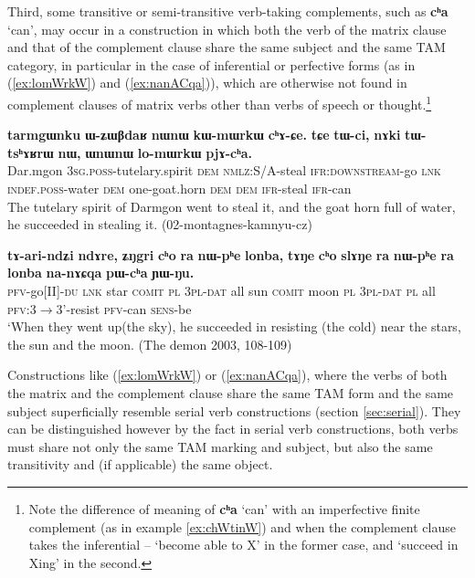 \documentclass[oneside,a4paper,11pt]{article}
\newcommand{\ipa}[1]{\textbf{\phon#1}} %
\newcommand{\jpg}[2]{\ipa{#1} `#2'} %
\newcommand{\refb}[1]{(\ref{#1})}
\begin{document}
Third, some transitive or semi-transitive verb-taking complements, such as \jpg{cʰa}{can}, may occur in a construction in which both the verb of the matrix clause and that of the complement clause share the same subject and the same TAM category, in particular in the case of inferential or perfective forms (as in \refb{ex:lomWrkW} and \refb{ex:nanACqa}), which are otherwise not found in complement clauses of matrix verbs other than verbs of speech or thought.\footnote{Note the difference of meaning of \jpg{cʰa}{can} with an imperfective finite complement (as in example \ref{ex:chWtinW}) and when the complement clause takes the inferential -- `become able to X' in the former case, and `succeed in Xing' in the second.}
\begin{exe}
\ex \label{ex:lomWrkW}
\gll 
\ipa{tarmgɯnku} 	\ipa{ɯ-ʑɯβdaʁ} 	\ipa{nɯnɯ} 	\ipa{kɯ-mɯrkɯ} 	\ipa{cʰɤ-ɕe.} 	\ipa{tɕe} 	\ipa{tɯ-ci,} 	\ipa{nɤki} 	\ipa{tɯ-tsʰɤʁrɯ} 	\ipa{nɯ,} 	\ipa{ɯnɯnɯ} 	\ipa{lo-mɯrkɯ} 	\ipa{pjɤ-cʰa.} \\
Dar.mgon \textsc{3sg.poss}-tutelary.spirit \textsc{dem} \textsc{nmlz}:S/A-steal \textsc{ifr:downstream}-go \textsc{lnk} \textsc{indef.poss}-water \textsc{dem} one-goat.horn \textsc{dem} \textsc{dem} \textsc{ifr}-steal \textsc{ifr}-can \\
\glt The tutelary spirit of Darmgon went to steal it, and the goat horn full of water, he succeeded in stealing it. (02-montagnes-kamnyu-cz)
\end{exe}


\begin{exe}
\ex \label{ex:nanACqa}
\gll \ipa{tɤ-ari-ndʑi} 	\ipa{ndɤre,} 	\ipa{ʑŋgri} 	\ipa{cʰo} 	\ipa{ra} 	\ipa{nɯ-pʰe} 	\ipa{lonba,} 	\ipa{tɤŋe} 	\ipa{cʰo} 	\ipa{slɤŋe} 	\ipa{ra} 	\ipa{nɯ-pʰe} 	\ipa{ra} 	\ipa{lonba} 	\ipa{na-nɤɕqa} 	\ipa{pɯ-cʰa} 	\ipa{ɲɯ-ŋu.} \\ 
\textsc{pfv}-go[II]-\textsc{du} \textsc{lnk} star \textsc{comit} \textsc{pl} \textsc{3pl-dat} all sun \textsc{comit} moon \textsc{pl} \textsc{3pl-dat} \textsc{pl} all \textsc{pfv}:3$\rightarrow$3'-resist \textsc{pfv}-can \textsc{sens}-be \\
\glt `When they went up(the sky), he succeeded in resisting (the cold) near the stars, the sun and the moon. (The demon 2003, 108-109)
\end{exe}

Constructions like (\ref{ex:lomWrkW}) or (\ref{ex:nanACqa}), where the verbs of both the matrix and the complement clause share the same TAM form and the same subject superficially resemble serial verb constructions (section \ref{sec:serial}). They can be distinguished however by the fact in serial verb constructions, both verbs must share not only the same TAM marking and subject, but also the same transitivity and (if applicable) the same object.
\end{document}
